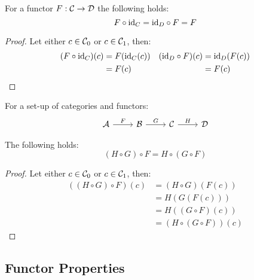 \begin{theorem}
  For a functor $F:\mathcal{C}\to \mathcal{D}$ the following holds:
  \[F \circ \mathrm{id}_C = \mathrm{id}_D \circ F = F\]

  \begin{proof}
    Let either $c\in \mathcal{C}_0$ or $c\in \mathcal{C}_1$, then:
    \[
      \begin{aligned}
        (F \circ \mathrm{id}_C)(c)
          &= F(\mathrm{id}_C(c))\\
          &= F (c)
      \end{aligned}
      \quad
      \begin{aligned}
        (\mathrm{id}_D \circ F)(c)
          &= \mathrm{id}_D (F (c))\\
          &= F (c)
      \end{aligned}
    \]
  \end{proof}
\end{theorem}

\begin{theorem}
  For a set-up of categories and functors:
  \[\begin{tikzcd}[ampersand replacement=\&]
    \A \& \B \& \C \& \D
    \arrow["F", from=1-1, to=1-2]
    \arrow["G", from=1-2, to=1-3]
    \arrow["H", from=1-3, to=1-4]
  \end{tikzcd}\]

  The following holds:
  \[(H \circ G) \circ F = H\circ(G\circ F)\]

  \begin{proof}
    Let either $c\in \mathcal{C}_0$ or $c\in \mathcal{C}_1$, then:
    \[
      \begin{aligned}
        ((H \circ G) \circ F) (c)
          &= (H\circ G) (F (c))\\
          &= H(G(F(c)))\\
          &= H((G\circ F)(c))\\
          &= (H\circ(G\circ F)) (c)
      \end{aligned}
    \]
  \end{proof}
\end{theorem}

\subsection{Functor Properties}

